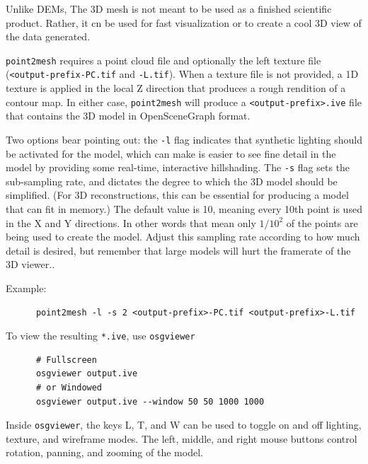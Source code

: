 Unlike DEMs, The 3D mesh is not meant to be used as a finished
scientific product.  Rather, it cn be used for fast visualization or
to create a cool 3D view of the data generated. 

\verb#point2mesh# requires a point cloud file and optionally the left
texture file ({\tt <output-prefix-PC.tif} and
{\tt <output-prefix>-L.tif}). When a texture file is not provided, a
1D texture is applied in the local Z direction that produces a rough
rendition of a contour map.  In either case, \verb#point2mesh# will
produce a \verb#<output-prefix>.ive# file that contains the 3D model
in OpenSceneGraph format.

Two options bear pointing out: the \verb#-l# flag indicates that
synthetic lighting should be activated for the model, which can make
is easier to see fine detail in the model by providing some real-time,
interactive hillshading.  The \verb#-s# flag sets the sub-sampling
rate, and dictates the degree to which the 3D model should be
simplified.  (For 3D reconstructions, this can be essential for
producing a model that can fit in memory.)  The default value is 10,
meaning every 10th point is used in the X and Y directions. In other
words that mean only $1/10^2$ of the points are being used to create
the model. Adjust this sampling rate according to how much detail is
desired, but remember that large models will hurt the framerate of the
3D viewer..

Example:
\begin{verbatim}
      point2mesh -l -s 2 <output-prefix>-PC.tif <output-prefix>-L.tif
\end{verbatim}

To view the resulting \verb#*.ive#, use \verb#osgviewer#

\begin{verbatim}
      # Fullscreen
      osgviewer output.ive
      # or Windowed
      osgviewer output.ive --window 50 50 1000 1000
\end{verbatim}

Inside \verb#osgviewer#, the keys L, T, and W can be used to toggle on
and off lighting, texture, and wireframe modes.  The left, middle, and
right mouse buttons control rotation, panning, and zooming of the
model.

